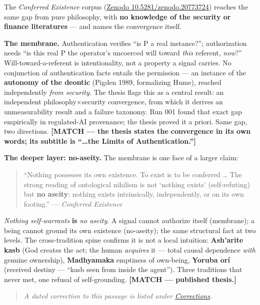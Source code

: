 \documentclass[11pt]{article}
\begin{document}
The \emph{Conferred Existence} corpus (\href{https://doi.org/10.5281/zenodo.20773724}{Zenodo 10.5281/\allowbreak{}zenodo.20773724}) reaches the same gap from pure philosophy, with \textbf{no knowledge of the security or finance literatures} — and names the convergence itself.

\textbf{The membrane.} Authentication verifies ``is P a real instance?''; authorization needs ``is this real P the operator's uncoerced will toward \emph{this} referent, \emph{now}?'' Will-toward-a-referent is intentionality, not a property a signal carries. No conjunction of authentication facts entails the permission — an instance of the \textbf{autonomy of the deontic} (Pigden 1989, formalizing Hume), reached independently \emph{from security}. The thesis flags this as a central result: an independent philosophy×security convergence, from which it derives an unmeasurability result and a failure taxonomy. Run 001 found that exact gap empirically in regulated-AI provenance; the thesis proved it a priori. Same gap, two directions. \textbf{[MATCH — the thesis states the convergence in its own words; its subtitle is ``…the Limits of Authentication.'']}

\textbf{The deeper layer: no-aseity.} The membrane is one face of a larger claim:

\begin{quote}
``Nothing possesses its own existence. To exist is to be conferred … The strong reading of ontological nihilism is not `nothing exists' (self-refuting) but \textbf{no aseity}: nothing exists intrinsically, independently, or on its own footing.'' — \emph{Conferred Existence}
\end{quote}

\emph{Nothing self-warrants} \textbf{is} \emph{no aseity}. A signal cannot authorize itself (membrane); a being cannot ground its own existence (no-aseity); the same structural fact at two levels. The cross-tradition spine confirms it is not a local intuition: \textbf{Ash'arite kasb} (God creates the act; the human \emph{acquires} it — total causal dependence \emph{with} genuine ownership), \textbf{Madhyamaka} emptiness of own-being, \textbf{Yoruba orí} (received destiny — ``kasb seen from inside the agent''). Three traditions that never met, one refusal of self-grounding. \textbf{[MATCH — published thesis.]}

\begin{quote}\small\emph{A dated correction to this passage is listed under \hyperref[corrections]{Corrections}.}\end{quote}
\end{document}
